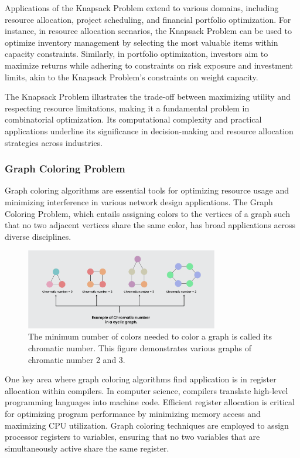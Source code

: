 \documentclass[11pt]{report}
\begin{document}
        Applications of the Knapsack Problem extend to various domains, including resource allocation, project scheduling, and financial portfolio optimization. For instance, in resource allocation scenarios, the Knapsack Problem can be used to optimize inventory management by selecting the most valuable items within capacity constraints. Similarly, in portfolio optimization, investors aim to maximize returns while adhering to constraints on risk exposure and investment limits, akin to the Knapsack Problem's constraints on weight capacity.
        
        The Knapsack Problem illustrates the trade-off between maximizing utility and respecting resource limitations, making it a fundamental problem in combinatorial optimization. Its computational complexity and practical applications underline its significance in decision-making and resource allocation strategies across industries.

        \subsubsection{Graph Coloring Problem}
        Graph coloring algorithms are essential tools for optimizing resource usage and minimizing interference in various network design applications. The Graph Coloring Problem, which entails assigning colors to the vertices of a graph such that no two adjacent vertices share the same color, has broad applications across diverse disciplines\cite{jensen2011graph}. 

        \begin{figure}[h!]
            \centering
            \includegraphics[width=0.75\textwidth,keepaspectratio]{Images/chromatic-number-of-cycle-graph-example.png}
            \caption{The minimum number of colors needed to color a graph is called its chromatic number. This figure demonstrates various graphs of chromatic number 2 and 3.}
            \label{fig:chromatic_number}
        \end{figure}

        One key area where graph coloring algorithms find application is in register allocation within compilers. In computer science, compilers translate high-level programming languages into machine code. Efficient register allocation is critical for optimizing program performance by minimizing memory access and maximizing CPU utilization. Graph coloring techniques are employed to assign processor registers to variables, ensuring that no two variables that are simultaneously active share the same register.
        
\end{document}
